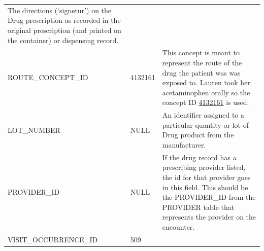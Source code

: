 \documentclass[11pt]{book}
\begin{document}
\begin{longtable}[]{@{}lll@{}}
\begin{minipage}[t]{0.47\columnwidth}
The directions (`signetur') on the Drug prescription as recorded in the
original prescription (and printed on the container) or dispensing
record.\strut
\end{minipage}\tabularnewline
\begin{minipage}[t]{0.30\columnwidth}\raggedright\strut
ROUTE\_CONCEPT\_ID\strut
\end{minipage} & \begin{minipage}[t]{0.14\columnwidth}\raggedright\strut
4132161\strut
\end{minipage} & \begin{minipage}[t]{0.47\columnwidth}\raggedright\strut
This concept is meant to represent the route of the drug the patient was
was exposed to. Lauren took her acetaminophen orally so the concept ID
\href{http://athena.ohdsi.org/search-terms/terms/4132161}{4132161} is
used.\strut
\end{minipage}\tabularnewline
\begin{minipage}[t]{0.30\columnwidth}\raggedright\strut
LOT\_NUMBER\strut
\end{minipage} & \begin{minipage}[t]{0.14\columnwidth}\raggedright\strut
NULL\strut
\end{minipage} & \begin{minipage}[t]{0.47\columnwidth}\raggedright\strut
An identifier assigned to a particular quantity or lot of Drug product
from the manufacturer.\strut
\end{minipage}\tabularnewline
\begin{minipage}[t]{0.30\columnwidth}\raggedright\strut
PROVIDER\_ID\strut
\end{minipage} & \begin{minipage}[t]{0.14\columnwidth}\raggedright\strut
NULL\strut
\end{minipage} & \begin{minipage}[t]{0.47\columnwidth}\raggedright\strut
If the drug record has a prescribing provider listed, the id for that
provider goes in this field. This should be the PROVIDER\_ID from the
PROVIDER table that represents the provider on the encounter.\strut
\end{minipage}\tabularnewline
\begin{minipage}[t]{0.30\columnwidth}\raggedright\strut
VISIT\_OCCURRENCE\_ID\strut
\end{minipage} & \begin{minipage}[t]{0.14\columnwidth}\raggedright\strut
509\strut
\end{minipage} & \begin{minipage}[t]{0.47\columnwidth}\raggedright\strut

\end{minipage}
\end{longtable}
\end{document}
